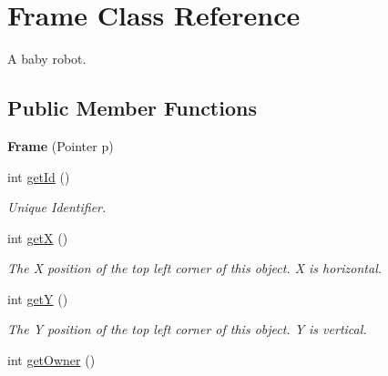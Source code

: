 \hypertarget{classFrame}{
\section{Frame Class Reference}
\label{classFrame}
}


A baby robot.  


\subsection*{Public Member Functions}
\begin{DoxyCompactItemize}
\item 
\hypertarget{classFrame_aec793ebd2605aebd01d46598f29267bd}{
{\bfseries Frame} (Pointer p)}
\label{classFrame_aec793ebd2605aebd01d46598f29267bd}

\item 
\hypertarget{classFrame_ade874be014eebf236ee2ff519d1e7f4c}{
int \hyperlink{classFrame_ade874be014eebf236ee2ff519d1e7f4c}{getId} ()}
\label{classFrame_ade874be014eebf236ee2ff519d1e7f4c}

\begin{DoxyCompactList}\small\item\em Unique Identifier. \item\end{DoxyCompactList}\item 
\hypertarget{classFrame_ac75792df8c0997a6251b67b5b19cdaf3}{
int \hyperlink{classFrame_ac75792df8c0997a6251b67b5b19cdaf3}{getX} ()}
\label{classFrame_ac75792df8c0997a6251b67b5b19cdaf3}

\begin{DoxyCompactList}\small\item\em The X position of the top left corner of this object. X is horizontal. \item\end{DoxyCompactList}\item 
\hypertarget{classFrame_a2cf0bdc9ac8f95db156493848be32915}{
int \hyperlink{classFrame_a2cf0bdc9ac8f95db156493848be32915}{getY} ()}
\label{classFrame_a2cf0bdc9ac8f95db156493848be32915}

\begin{DoxyCompactList}\small\item\em The Y position of the top left corner of this object. Y is vertical. \item\end{DoxyCompactList}\item 
\hypertarget{classFrame_a13edeeab79fa4a59353aabc5de650cd3}{
int \hyperlink{classFrame_a13edeeab79fa4a59353aabc5de650cd3}{getOwner} ()}
\label{classFrame_a13edeeab79fa4a59353aabc5de650cd3}


\end{DoxyCompactItemize}
